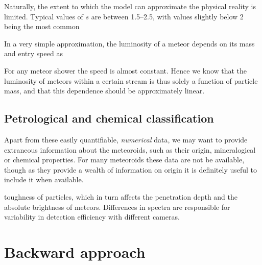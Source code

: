             Naturally, the extent to which the model can approximate the physical reality is limited.
            Typical values of $s$ are between \numrange{1.5}{2.5}, with values slightly below 2 being the most common \cite{...}

            In a very simple approximation, the luminosity of a meteor depends on its mass and entry speed as

            For any meteor shower the speed is almost constant. Hence we know that the luminosity of meteors
            within a certain stream is thus solely a function of particle mass, and that this dependence should
            be approximately linear.

        \subsection{Petrological and chemical classification} \label{mpac}
            Apart from these easily quantifiable, \textit{numerical} data, we may want to
            provide extraneous information about the meteoroids, such as their origin,
            mineralogical or chemical properties.
            For many meteoroids these data are not be available,
            though as they provide a wealth of information on origin
            it is definitely useful to include it when available.


            toughness of particles, which in turn affects the penetration depth
            and the absolute brightness of meteors.
            Differences in spectra are responsible for variability in detection efficiency with different cameras.


\section{Backward approach} \label{ab}

